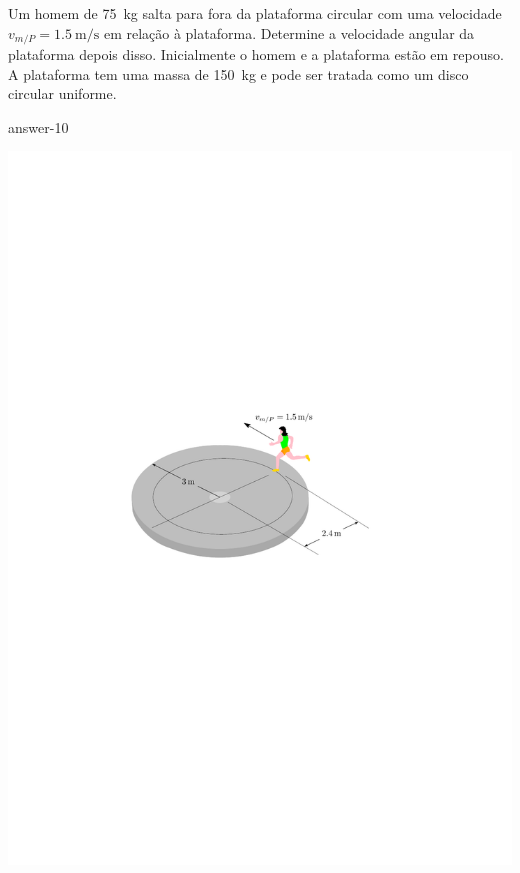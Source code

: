 \item Um homem de \SI{75}{\kilogram} salta para fora da plataforma circular com uma velocidade $v_{m/P}=\SI{1.5}{\meter/\second}$ em relação à plataforma. Determine a velocidade angular da plataforma depois disso. Inicialmente o homem e a plataforma estão em repouso. A plataforma tem uma massa de \SI{150}{\kilogram} e pode ser tratada como um disco circular uniforme.

{answer-10}

\vspace{-.9cm}
\begin{flushright}
	\includegraphics[scale=1.25]{../../images/draw_7_new}
\end{flushright}
